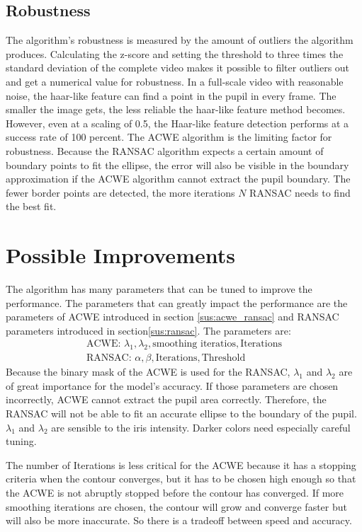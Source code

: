 \subsection{Robustness}
The algorithm's robustness is measured by the amount of outliers the algorithm produces. Calculating the z-score and setting the threshold to three times the standard deviation of the complete video makes it possible to filter outliers out and get a numerical value for robustness. In a full-scale video with reasonable noise, the haar-like feature can find a point in the pupil in every frame. The smaller the image gets, the less reliable the haar-like feature method becomes. However, even at a scaling of 0.5, the Haar-like feature detection performs at a success rate of 100 percent. The ACWE algorithm is the limiting factor for robustness. Because the RANSAC algorithm expects a certain amount of boundary points to fit the ellipse, the error will also be visible in the boundary approximation if the ACWE algorithm cannot extract the pupil boundary. The fewer border points are detected, the more iterations $N$ RANSAC needs to find the best fit. 

\section{Possible Improvements}
The algorithm has many parameters that can be tuned to improve the performance. The parameters that can greatly impact the performance are the parameters of ACWE introduced in section \ref{sus:acwe_ransac} and RANSAC parameters introduced in section\ref{sus:ransac}. The parameters are:
\begin{gather*}
    \text{ACWE: } \lambda_1, \lambda_2,\text{smoothing iteratios}, \text{Iterations}\\
    \text{RANSAC: } \alpha, \beta, \text{Iterations}, \text{Threshold}
\end{gather*}
Because the binary mask of the ACWE is used for the RANSAC, $\lambda_1$ and $\lambda_2$ are of great importance for the model's accuracy. If those parameters are chosen incorrectly, ACWE cannot extract the pupil area correctly. Therefore, the RANSAC will not be able to fit an accurate ellipse to the boundary of the pupil. $\lambda_1$ and $\lambda_2$ are sensible to the iris intensity. Darker colors need especially careful tuning. 

The number of Iterations is less critical for the ACWE because it has a stopping criteria when the contour converges, but it has to be chosen high enough so that the ACWE is not abruptly stopped before the contour has converged. If more smoothing iterations are chosen, the contour will grow and converge faster but will also be more inaccurate. So there is a tradeoff between speed and accuracy. 

